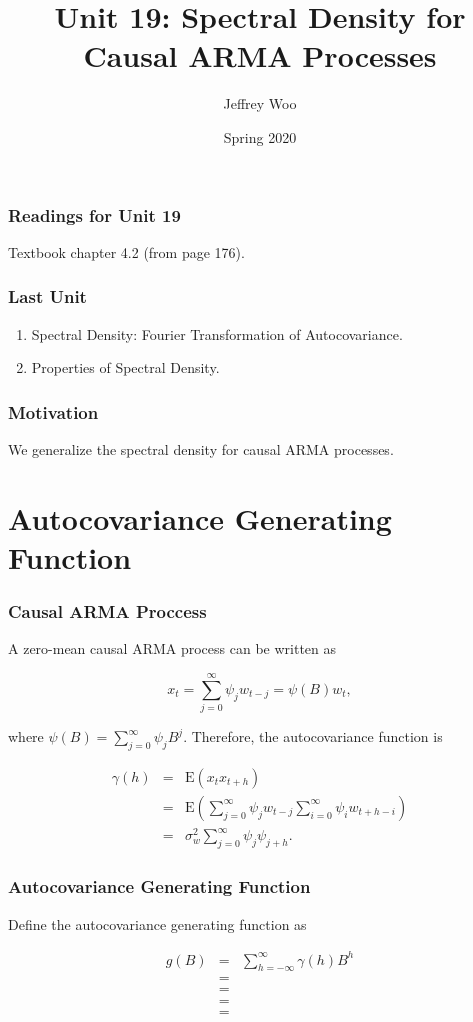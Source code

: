 \documentclass[%
xcolor=pdftex]{beamer}
\title{Unit 19: Spectral Density for Causal ARMA Processes}
\author[STAT 5170: Applied Time Series, Unit 19]{Jeffrey Woo}
\institute{Department of Statistics, University of Virginia}
\date{Spring 2020}
\begin{document}
\frame{\titlepage}

\begin{frame}
\frametitle{Readings for Unit 19}

Textbook chapter 4.2 (from page 176).

\end{frame}


\begin{frame}
\frametitle{Last Unit}
\begin{enumerate}
\item Spectral Density: Fourier Transformation of Autocovariance.
\item Properties of Spectral Density.
\end{enumerate}
\end{frame}

\begin{frame}
\frametitle{Motivation}

We generalize the spectral density for causal ARMA processes.

\end{frame}

\section{Autocovariance Generating Function}
\frame{\tableofcontents[currentsection]}

\begin{frame}
\frametitle{Causal ARMA Proccess}

A zero-mean causal ARMA process can be written as

$$
x_t = \sum_{j=0}^{\infty} \psi_j w_{t-j} = \psi(B)w_t,
$$

where $\psi(B) = \sum_{j=0}^{\infty} \psi_j B^j$. Therefore, the autocovariance function is

\begin{eqnarray*}
\gamma(h) &=& \mbox{E}(x_t x_{t+h}) \\
          &=& \mbox{E}(\sum_{j=0}^{\infty} \psi_j w_{t-j} \sum_{i=0}^{\infty} \psi_i w_{t+h-i}) \\
          &=& \sigma_w^2 \sum_{j=0}^{\infty} \psi_j \psi_{j+h}.
\end{eqnarray*}

\end{frame}

\begin{frame}
\frametitle{Autocovariance Generating Function}

Define the autocovariance generating function as

\begin{eqnarray} \label{eq:generate}
g(B) &=& \sum_{h=-\infty}^{\infty} \gamma(h) B^h \\
          &=& \nonumber \\
          &=& \nonumber \\
          &=& \nonumber \\
          &=& \nonumber
\end{eqnarray}

\end{frame}
\end{document}
